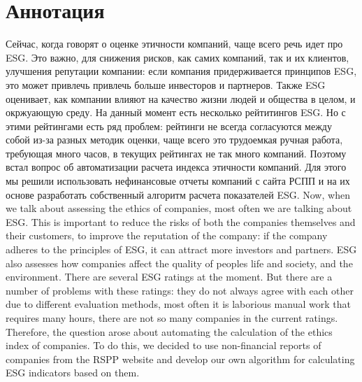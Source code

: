 \documentclass[a4paper, 14pt]{extarticle}
\begin{document}
\section*{Аннотация}
Сейчас, когда говорят о оценке этичности компаний, чаще всего речь идет про ESG. Это важно, для снижения рисков, как самих компаний, так и их клиентов, улучшения репутации компании: если компания придерживается принципов ESG, это может привлечь привлечь больше инвесторов и партнеров. Также ESG оценивает, как компании влияют на качество жизни людей и общества в целом, и окржуающую среду. На данный момент есть несколько рейтитингов ESG. Но с этими рейтингами есть ряд проблем: рейтинги не всегда согласуются между собой из-за разных методик оценки, чаще всего это трудоемкая ручная работа, требующая много часов, в текущих рейтингах не так много компаний. Поэтому встал вопрос об автоматизации расчета индекса этичности компаний. Для этого мы решили использовать нефинансовые отчеты компаний с сайта РСПП и на их основе разработать собственный алгоритм расчета показателей ESG.
\newline
\newline
Now, when we talk about assessing the ethics of companies, most often we are talking about ESG. This is important to reduce the risks of both the companies themselves and their customers, to improve the reputation of the company: if the company adheres to the principles of ESG, it can attract more investors and partners. ESG also assesses how companies affect the quality of peoples life and society, and the environment. There are several ESG ratings at the moment. But there are a number of problems with these ratings: they do not always agree with each other due to different evaluation methods, most often it is laborious manual work that requires many hours, there are not so many companies in the current ratings. Therefore, the question arose about automating the calculation of the ethics index of companies. To do this, we decided to use non-financial reports of companies from the RSPP website and develop our own algorithm for calculating ESG indicators based on them.

\newpage
\setcounter{page}{3}

\tableofcontents

\newpage
\setcounter{page}{4}
\pagestyle{plain}
\end{document}
